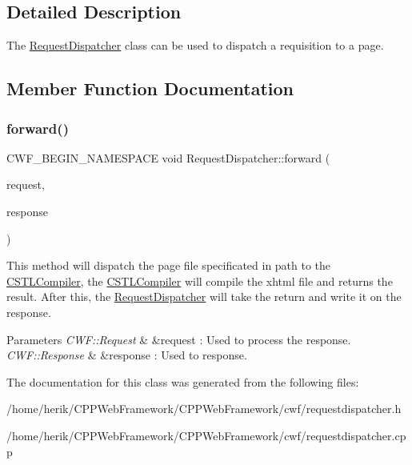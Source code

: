\subsection{Detailed Description}
The \hyperlink{class_request_dispatcher}{Request\+Dispatcher} class can be used to dispatch a requisition to a page. 

\subsection{Member Function Documentation}
\mbox{\label{class_request_dispatcher_a6416fc9441670d1de84b3c8262d13220}} 
\subsubsection{\texorpdfstring{forward()}{forward()}}
{\footnotesize\ttfamily C\+W\+F\+\_\+\+B\+E\+G\+I\+N\+\_\+\+N\+A\+M\+E\+S\+P\+A\+CE void Request\+Dispatcher\+::forward (\begin{DoxyParamCaption}\item[{C\+W\+F\+::\+Request \&}]{request,  }\item[{C\+W\+F\+::\+Response \&}]{response }\end{DoxyParamCaption})}



This method will dispatch the page file specificated in path to the \hyperlink{class_c_s_t_l_compiler}{C\+S\+T\+L\+Compiler}, the \hyperlink{class_c_s_t_l_compiler}{C\+S\+T\+L\+Compiler} will compile the xhtml file and returns the result. After this, the \hyperlink{class_request_dispatcher}{Request\+Dispatcher} will take the return and write it on the response. 


\begin{DoxyParams}{Parameters}
{\em C\+W\+F\+::\+Request} & \&request \+: Used to process the response. \\
\hline
{\em C\+W\+F\+::\+Response} & \&response \+: Used to response. \\
\hline
\end{DoxyParams}


The documentation for this class was generated from the following files\+:\begin{DoxyCompactItemize}
\item 
/home/herik/\+C\+P\+P\+Web\+Framework/\+C\+P\+P\+Web\+Framework/cwf/requestdispatcher.\+h\item 
/home/herik/\+C\+P\+P\+Web\+Framework/\+C\+P\+P\+Web\+Framework/cwf/requestdispatcher.\+cpp\end{DoxyCompactItemize}

